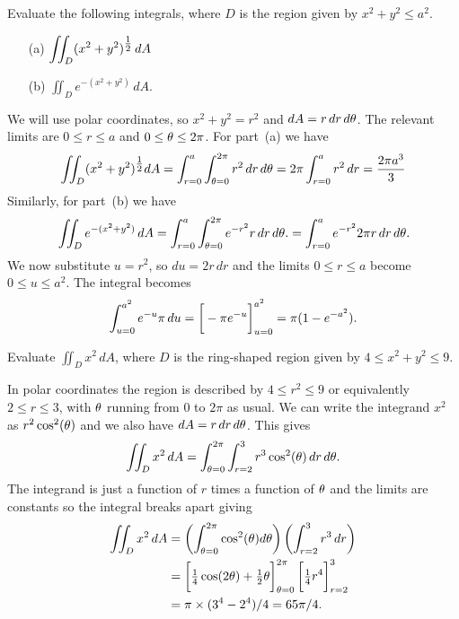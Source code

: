 \documentclass[a4paper]{amsart}
\renewenvironment{solution}{\SolutionInline}{\endSolutionInline}
\begin{document}
\begin{exercise}
 Evaluate the following integrals, where $D$ is the region given by
 $x^2+y^2\leq a^2$.
 \begin{itemize}
  \item[(a)] $\displaystyle \iint_D(x^2+y^2)^{\tfrac{1}{2}}\,dA$
  \item[(b)] $\displaystyle \iint_D e^{-(x^2+y^2)}\,dA$.
 \end{itemize}
\end{exercise}
\begin{solution}
 We will use polar coordinates, so $x^2+y^2=r^2$ and
 $dA=r\,dr\,d\theta$.  The relevant limits are $0\leq r\leq a$ and
 $0\leq\theta\leq 2\pi$.  For part~(a) we have
 \[ \iint_D(x^2+y^2)^{\tfrac{1}{2}}dA 
    = \int_{r=0}^a\int_{\theta=0}^{2\pi} r^2\,dr\,d\theta
    = 2\pi\int_{r=0}^ar^2\,dr = \frac{2\pi a^3}{3}
 \]
 Similarly, for part~(b) we have
 \[ \iint_D e^{-(x^2+y^2)}\,dA 
    = \int_{r=0}^a\int_{\theta=0}^{2\pi} e^{-r^2}r\,dr\,d\theta.
    = \int_{r=0}^a e^{-r^2}2\pi r\,dr\,d\theta.
 \]
 We now substitute $u=r^2$, so $du=2r\,dr$ and the limits
 $0\leq r\leq a$ become $0\leq u\leq a^2$.  The integral becomes
 \[ \int_{u=0}^{a^2} e^{-u} \pi\,du = 
     \CH{-\pi e^{-u}}_{u=0}^{a^2} = \pi(1-e^{-a^2}).
 \]
\end{solution}

\begin{exercise}
 Evaluate $\iint_D x^2\,dA$, where $D$ is the ring-shaped region
 given by $4\leq x^2+y^2\leq 9$. 
\end{exercise}
\begin{solution}
 In polar coordinates the region is described by $4\leq r^2\leq 9$ or
 equivalently $2\leq r\leq 3$, with $\theta$ running from $0$ to $2\pi$
 as usual.  We can write the integrand $x^2$ as $r^2\cos^2(\theta)$ and
 we also have $dA=r\,dr\,d\theta$.  This gives 
 \[ \iint_D x^2\,dA
    = \int_{\theta=0}^{2\pi}\int_{r=2}^3
        r^3\cos^2(\theta) \,dr\,d\theta.
 \]
 The integrand is just a function of $r$ times a function of $\theta$
 and the limits are constants so the integral breaks apart giving 
 \begin{align*}
  \iint_D x^2\,dA
   &= \left(\int_{\tht=0}^{2\pi}\cos^2(\tht)d\tht\right)
      \left(\int_{r=2}^3r^3 \,dr\right) \\
   &= \CH{\tfrac{1}{4}\cos(2\tht)+\tfrac{1}{2}\tht}_{\tht=0}^{2\pi}
      \CH{\tfrac{1}{4}r^4}_{r=2}^3 \\
   &= \pi \tm (3^4 - 2^4)/4 = 65\pi/4.
 \end{align*}
\end{solution}
\end{document}
